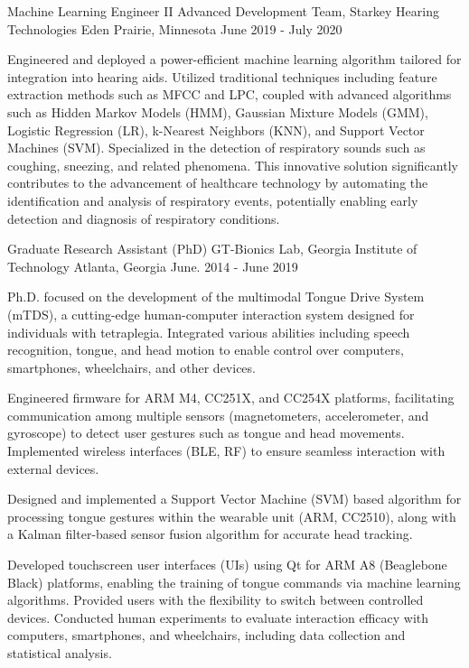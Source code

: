 \begin{cventries}
{\begin{cvitems}
      \end{cvitems}
    }
\cventry
    {Machine Learning Engineer II}
    {Advanced Development Team, Starkey Hearing Technologies}
    {Eden Prairie, Minnesota}
    {June 2019 - July 2020}
    {
      \begin{cvitems}
        \item {Engineered and deployed a power-efficient machine learning algorithm tailored for integration into hearing aids. Utilized traditional techniques including feature extraction methods such as MFCC and LPC, coupled with advanced algorithms such as Hidden Markov Models (HMM), Gaussian Mixture Models (GMM), Logistic Regression (LR), k-Nearest Neighbors (KNN), and Support Vector Machines (SVM). Specialized in the detection of respiratory sounds such as coughing, sneezing, and related phenomena. This innovative solution significantly contributes to the advancement of healthcare technology by automating the identification and analysis of respiratory events, potentially enabling early detection and diagnosis of respiratory conditions.}
      \end{cvitems}
    }
  \cventry
    {Graduate Research Assistant (PhD)}
    {GT-Bionics Lab, Georgia Institute of Technology}
    {Atlanta, Georgia}
    {June. 2014 - June 2019}
    {
      \begin{cvitems}
        \item {Ph.D. focused on the development of the multimodal Tongue Drive System (mTDS), a cutting-edge human-computer interaction system designed for individuals with tetraplegia. Integrated various abilities including speech recognition, tongue, and head motion to enable control over computers, smartphones, wheelchairs, and other devices.}
        \item{Engineered firmware for ARM M4, CC251X, and CC254X platforms, facilitating communication among multiple sensors (magnetometers, accelerometer, and gyroscope) to detect user gestures such as tongue and head movements. Implemented wireless interfaces (BLE, RF) to ensure seamless interaction with external devices.}
        \item{Designed and implemented a Support Vector Machine (SVM) based algorithm for processing tongue gestures within the wearable unit (ARM, CC2510), along with a Kalman filter-based sensor fusion algorithm for accurate head tracking.}
        \item{Developed touchscreen user interfaces (UIs) using Qt for ARM A8 (Beaglebone Black) platforms, enabling the training of tongue commands via machine learning algorithms. Provided users with the flexibility to switch between controlled devices. Conducted human experiments to evaluate interaction efficacy with computers, smartphones, and wheelchairs, including data collection and statistical analysis.}

\end{cvitems}}
\end{cventries}
